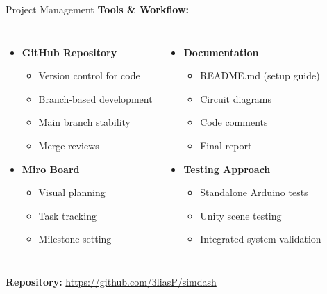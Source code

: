 \documentclass[aspectratio=169]{beamer}
\newenvironment{tlist}{\begin{itemize}}{\end{itemize}}
\begin{document}
\begin{frame}{Project Management}
\textbf{Tools \& Workflow:}
\begin{columns}[T]
\begin{tlist}
    \item \textbf{GitHub Repository}
    \begin{tlist}
        \item Version control for code
        \item Branch-based development
        \item Main branch stability
        \item Merge reviews
    \end{tlist}
    
    \item \textbf{Miro Board}
    \begin{tlist}
        \item Visual planning
        \item Task tracking
        \item Milestone setting
    \end{tlist}
\end{tlist}

\begin{tlist}
    \item \textbf{Documentation}
    \begin{tlist}
        \item README.md (setup guide)
        \item Circuit diagrams
        \item Code comments
        \item Final report
    \end{tlist}
    
    \item \textbf{Testing Approach}
    \begin{tlist}
        \item Standalone Arduino tests
        \item Unity scene testing
        \item Integrated system validation
    \end{tlist}
\end{tlist}
\end{columns}

\vspace{0.3cm}
\textbf{Repository:} \url{https://github.com/3liasP/simdash}
\end{frame}
\end{document}
